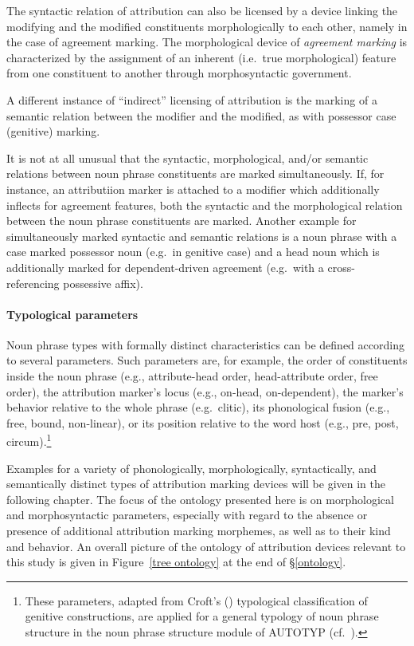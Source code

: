 The syntactic relation of attribution can also be licensed by a device linking the modifying and the modified constituents morphologically to each other, namely in the case of agreement marking. The morphological device of \emph{agreement marking} is characterized by the assignment of an inherent (i.e.~true morphological) feature from one constituent to another through morphosyntactic government.

A different instance of “indirect” licensing of attribution is the marking of a semantic relation between the modifier and the modified, as with possessor case (genitive) marking.

It is not at all unusual that the syntactic, morphological, and/or semantic relations between noun phrase constituents are marked simultaneously. If, for instance, an attributiion marker is attached to a modifier which additionally inflects for agreement features, both the syntactic and the morphological relation between the noun phrase constituents are marked. Another example for simultaneously marked syntactic and semantic relations is a noun phrase with a case marked possessor noun (e.g.~in genitive case) and a head noun which is additionally marked for dependent-driven agreement (e.g.~with a cross-referencing possessive affix).

\paragraph{Typological parameters} 
Noun phrase types with formally distinct characteristics can be defined according to several parameters. Such parameters are, for example, the order of constituents inside the noun phrase (e.g., attribute-head order, head-attribute order, free order), the attribution marker's locus (e.g., on-head, on-dependent), the marker's behavior relative to the whole phrase (e.g.~clitic), its phonological fusion (e.g., free, bound, non-linear), or its position relative to the word host (e.g., pre, post, circum).\footnote{These parameters, adapted from Croft's (\citeyear[93–94]{croft1995}) typological classification of genitive constructions, are applied for a general typology of noun phrase structure in the noun phrase structure module of AUTOTYP (cf.~\citealt{AUTOTYP-NP}).}

Examples for a variety of phonologically, morphologically, syntactically, and semantically distinct types of attribution marking devices will be given in the following chapter. The focus of the ontology presented here is on morphological and morphosyntactic parameters, especially with regard to the absence or presence of additional attribution marking morphemes, as well as to their kind and behavior. An overall picture of the ontology of attribution devices relevant to this study is given in Figure~\ref{tree ontology} at the end of \S\ref{ontology}.

